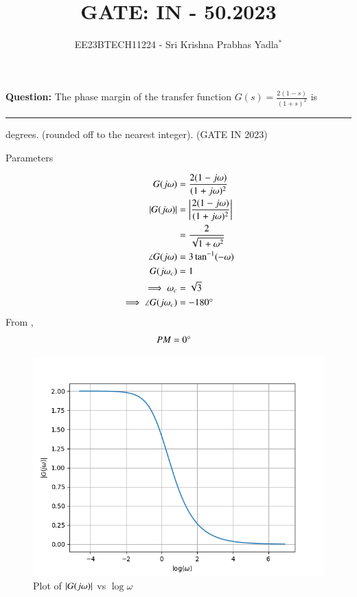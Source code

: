 \documentclass[journal,12pt,twocolumn]{IEEEtran}
\theoremstyle{remark}
\begin{document}

\vspace{3cm}

\title{GATE: IN - 50.2023}
\author{EE23BTECH11224 - Sri Krishna Prabhas Yadla$^{*}$%
}
\maketitle
\newpage
\bigskip

\renewcommand{\thefigure}{\arabic{figure}}
\renewcommand{\thetable}{\arabic{table}}


\vspace{3cm}
\textbf{Question:} The phase margin of the transfer function $G(s) = \frac{2(1-s)}{(1+s)^2}$ is \rule{1cm}{0.15mm} degrees. (rounded off to the nearest integer). \hfill (GATE IN 2023)\\
\solution
\begin{table}[htbp]
	\centering
	\def\arraystrech{1.5}
	
	\caption{Parameters}
	\label{tab:parameters}
\end{table}
\begin{align}
	G(j\omega) &= \frac{2(1-j\omega)}{(1+j\omega)^2} \\
	\left\vert G(j\omega)\right\vert &= \left\vert\frac{2(1-j\omega)}{(1+j\omega)^2}\right\vert \\
	&= \frac{2}{\sqrt{1+\omega^2}} \\
	\angle G(j\omega) &= 3\tan^{-1}(-\omega) \\
	G(j\omega_c) &= 1 \\ 
	\implies \omega_c &= \sqrt{3} \\
	\implies \angle G(j\omega_c)&= -180\degree
\end{align}
From ,
\begin{align}
	PM &= 0\degree
\end{align}
\begin{figure}[htbp]
	\includegraphics[width=\columnwidth]{figs/magnitude.png}
	\caption{Plot of $\left\vert G(j\omega)\right\vert$ vs $\log{\omega}$}
	\label{fig:mag/w}
\end{figure}
\end{document}
